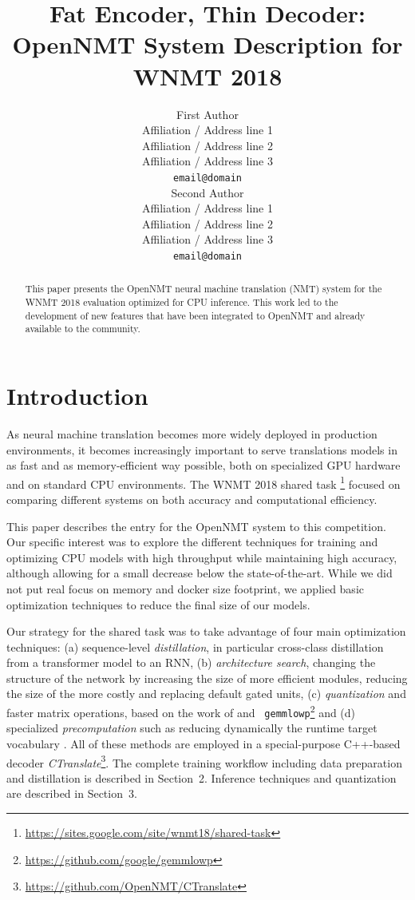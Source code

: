 \documentclass[11pt,a4paper]{article}
\title{Fat Encoder, Thin Decoder: \protect\\ OpenNMT System Description for WNMT 2018}
\author{First Author \\
  Affiliation / Address line 1 \\
  Affiliation / Address line 2 \\
  Affiliation / Address line 3 \\
  {\tt email@domain} \\\And
  Second Author \\
  Affiliation / Address line 1 \\
  Affiliation / Address line 2 \\
  Affiliation / Address line 3 \\
  {\tt email@domain} \\}
\date{}
\begin{document}
\maketitle
\begin{abstract}
  This paper presents the OpenNMT neural machine translation (NMT)
  system for the WNMT 2018 evaluation optimized for CPU
  inference. This work led to the development of new features that
  have been integrated to OpenNMT and already available to the
  community.

\end{abstract}

\section{Introduction}

As neural machine translation becomes more widely deployed in
production environments, it becomes increasingly important to serve
translations models in as fast and as memory-efficient way possible,
both on specialized GPU hardware and on standard CPU environments. The
WNMT 2018 shared task
\footnote{\url{https://sites.google.com/site/wnmt18/shared-task}}
focused on comparing different systems on both accuracy and
computational efficiency.


This paper describes the entry for the OpenNMT system to this
competition.  Our specific interest was to explore the different
techniques for training and optimizing CPU models with high throughput
while maintaining high accuracy, although allowing for a small
decrease below the state-of-the-art. While we did not put real focus
on memory and docker size footprint, we applied basic optimization
techniques to reduce the final size of our models.

Our strategy for the shared task was to take advantage of four main
optimization techniques: (a) sequence-level \textit{distillation}, in
particular cross-class distillation from a transformer model
\cite{vaswani2017attention} to an RNN, (b) \textit{architecture
  search}, changing the structure of the network by increasing the
size of more efficient modules, reducing the size of the more costly
and replacing default gated units, (c) \textit{quantization} and
faster matrix operations, based on the work of
 and {\tt
  gemmlowp}\footnote{\url{https://github.com/google/gemmlowp}} and (d)
specialized \textit{precomputation} such as reducing dynamically the
runtime target vocabulary \cite{shi2017speeding}. All of these
methods are employed in a special-purpose C++-based decoder
\textit{CTranslate}\footnote{\url{https://github.com/OpenNMT/CTranslate}}.
The complete training workflow including data preparation and
distillation is described in Section~2. Inference techniques and quantization are
described in Section~3.
\end{document}

